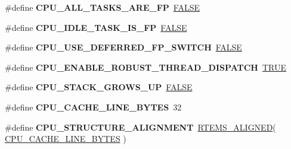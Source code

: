 \begin{DoxyCompactItemize}
\item 
\mbox{\label{group__RTEMSScoreCPUARM_ga225de03a8647bf307a73cf907969778d}} 
\#define {\bfseries C\+P\+U\+\_\+\+A\+L\+L\+\_\+\+T\+A\+S\+K\+S\+\_\+\+A\+R\+E\+\_\+\+FP}~\mbox{\hyperlink{group__RTEMSScoreBaseDefs_gaa93f0eb578d23995850d61f7d61c55c1}{F\+A\+L\+SE}}
\item 
\mbox{\label{group__RTEMSScoreCPUARM_gaf1c906c8ee4c3d012dc456285e42d3ee}} 
\#define {\bfseries C\+P\+U\+\_\+\+I\+D\+L\+E\+\_\+\+T\+A\+S\+K\+\_\+\+I\+S\+\_\+\+FP}~\mbox{\hyperlink{group__RTEMSScoreBaseDefs_gaa93f0eb578d23995850d61f7d61c55c1}{F\+A\+L\+SE}}
\item 
\mbox{\label{group__RTEMSScoreCPUARM_ga155bcf88149016c6c58f30eeab9f1598}} 
\#define {\bfseries C\+P\+U\+\_\+\+U\+S\+E\+\_\+\+D\+E\+F\+E\+R\+R\+E\+D\+\_\+\+F\+P\+\_\+\+S\+W\+I\+T\+CH}~\mbox{\hyperlink{group__RTEMSScoreBaseDefs_gaa93f0eb578d23995850d61f7d61c55c1}{F\+A\+L\+SE}}
\item 
\mbox{\label{group__RTEMSScoreCPUARM_ga0c634f4a6bc9236bcacafc9b6119e011}} 
\#define {\bfseries C\+P\+U\+\_\+\+E\+N\+A\+B\+L\+E\+\_\+\+R\+O\+B\+U\+S\+T\+\_\+\+T\+H\+R\+E\+A\+D\+\_\+\+D\+I\+S\+P\+A\+T\+CH}~\mbox{\hyperlink{group__RTEMSScoreBaseDefs_gaa8cecfc5c5c054d2875c03e77b7be15d}{T\+R\+UE}}
\item 
\mbox{\label{group__RTEMSScoreCPUARM_gac40d98a563f63934a5775f1366ba1b67}} 
\#define {\bfseries C\+P\+U\+\_\+\+S\+T\+A\+C\+K\+\_\+\+G\+R\+O\+W\+S\+\_\+\+UP}~\mbox{\hyperlink{group__RTEMSScoreBaseDefs_gaa93f0eb578d23995850d61f7d61c55c1}{F\+A\+L\+SE}}
\item 
\mbox{\label{group__RTEMSScoreCPUARM_gaafa1399e268a9ae6adf6d6aad4371688}} 
\#define {\bfseries C\+P\+U\+\_\+\+C\+A\+C\+H\+E\+\_\+\+L\+I\+N\+E\+\_\+\+B\+Y\+T\+ES}~32
\item 
\mbox{\label{group__RTEMSScoreCPUARM_gacd43704c7821a2c042d212801156584e}} 
\#define {\bfseries C\+P\+U\+\_\+\+S\+T\+R\+U\+C\+T\+U\+R\+E\+\_\+\+A\+L\+I\+G\+N\+M\+E\+NT}~\mbox{\hyperlink{structRTEMS__ALIGNED}{R\+T\+E\+M\+S\+\_\+\+A\+L\+I\+G\+N\+ED}}( \mbox{\hyperlink{no__cpu_2include_2rtems_2score_2cpu_8h_aafa1399e268a9ae6adf6d6aad4371688}{C\+P\+U\+\_\+\+C\+A\+C\+H\+E\+\_\+\+L\+I\+N\+E\+\_\+\+B\+Y\+T\+ES}} )

\end{DoxyCompactItemize}

